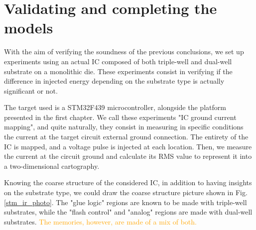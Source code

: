 
\section{Validating and completing the models}
With the aim of verifying the soundness of the previous conclusions, we set up experiments using an actual IC composed of both triple-well and dual-well substrate on a monolithic die.
These experiments consist in verifying if the difference in injected energy depending on the substrate type is actually significant or not.

The target used is a STM32F439 microcontroller, alongside the platform presented in the first chapter.
We call these experiments "IC ground current mapping", and quite naturally, they consist in measuring in specific conditions the current at the target circuit external ground connection.
The entirety of the IC is mapped, and a voltage pulse is injected at each location.
Then, we measure the current at the circuit ground and calculate its RMS value to represent it into a two-dimensional cartography.

Knowing the coarse structure of the considered IC, in addition to having insights on the substrate type, we could draw the coarse structure picture shown in Fig. \ref{stm_ir_photo}.
The "glue logic" regions are known to be made with triple-well substrates, while the "flash control" and "analog" regions are made with dual-well substrates.
\textcolor{orange}{The memories, however, are made of a mix of both.}
